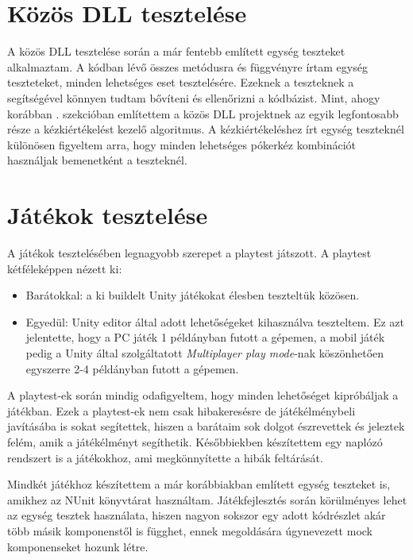 \documentclass[]{thesis-ekf}
\theoremstyle{definition}
\theoremstyle{remark}
\begin{document}
\section{Közös DLL tesztelése}

A közös DLL tesztelése során a már fentebb említett egység teszteket alkalmaztam. A kódban lévő összes metódusra és függvényre írtam egység teszteteket, minden lehetséges eset tesztelésére. Ezeknek a teszteknek a segítségével könnyen tudtam bővíteni és ellenőrizni a kódbázist. Mint, ahogy korábban . szekcióban említettem a közös DLL projektnek az egyik legfontosabb része a kézkiértékelést kezelő algoritmus. A kézkiértékeléshez írt egység teszteknél különösen figyeltem arra, hogy minden lehetséges pókerkéz kombinációt használjak bemenetként a teszteknél.

\section{Játékok tesztelése}

A játékok tesztelésében legnagyobb szerepet a playtest játszott. A playtest kétféleképpen nézett ki:

\begin{itemize}
	\item Barátokkal: a ki buildelt Unity játékokat élesben teszteltük közösen.
	\item Egyedül: Unity editor által adott lehetőségeket kihasználva teszteltem. Ez azt jelentette, hogy a PC játék 1 példányban futott a gépemen, a mobil játék pedig a Unity által szolgáltatott \emph{Multiplayer play mode}-nak köszönhetően egyszerre 2-4 példányban futott a gépemen. \cite{UnityMultiplayerPlayMode}
\end{itemize}

A playtest-ek során mindig odafigyeltem, hogy minden lehetőséget kipróbáljak a játékban. Ezek a playtest-ek nem csak hibakeresésre de játékélménybeli javításába is sokat segítettek, hiszen a barátaim sok dolgot észrevettek és jeleztek felém, amik a játékélményt segíthetik. Későbbiekben készítettem egy naplózó rendszert is a játékokhoz, ami megkönnyítette a hibák feltárását.

Mindkét játékhoz készítettem a már korábbiakban említett egység teszteket is, amikhez az NUnit könyvtárat használtam. Játékfejlesztés során körülményes lehet az egység tesztek használata, hiszen nagyon sokszor egy adott kódrészlet akár több másik komponenstől is függhet, ennek megoldására úgynevezett mock komponenseket hozunk létre. \cite{NUnit}
\end{document}
